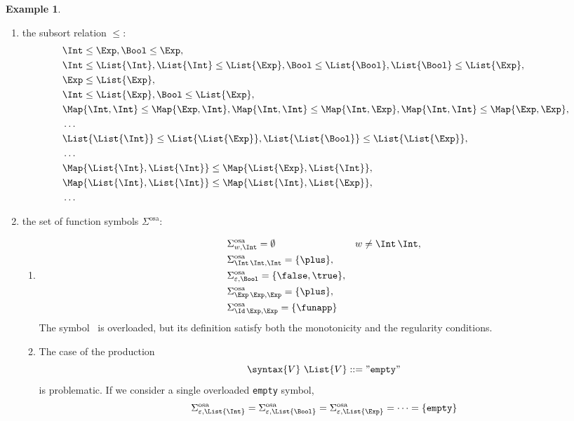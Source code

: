 \documentclass{article}
\theoremstyle{definition}
\newtheorem{example}{Example}[section]
\theoremstyle{definition}
\theoremstyle{definition}
\theoremstyle{definition}
\theoremstyle{theorem}
\theoremstyle{theorem}
\theoremstyle{theorem}
\theoremstyle{theorem}
\theoremstyle{theorem}
\begin{document}
{\begin{example}
\begin{enumerate}
\begin{align*}
&\Map{\List{\Int},\List{\Int}}, \Map{\List{\Int},\List{\Bool}}, \Map{\List{\Int},\List{\Exp}},\\
&\ldots\\
&\Map{\Map{\Int,\Int}, \Map{\Int,\Int}}, \Map{\Map{\Int,\Int},\Map{\Int,\Bool}},\\ 
&\ldots
\end{align*}
\item the subsort relation $\le$:
\begin{align*}
&\Int\le \Exp, \Bool\le \Exp,\\
&\Int\le \List{\Int}, \List{\Int}\le \List{\Exp}, \Bool\le\List{\Bool}, \List{\Bool}\le \List{\Exp},\\ &\Exp\le\List{\Exp},\\
&\Int\le \List{\Exp},  \Bool\le\List{\Exp},\\
&\Map{\Int,\Int}\le \Map{\Exp,\Int}, \Map{\Int,\Int}\le \Map{\Int,\Exp}, \Map{\Int,\Int}\le \Map{\Exp,\Exp},\\
&\ldots\\
&\List{\List{\Int}}\le\List{\List{\Exp}}, \List{\List{\Bool}}\le \List{\List{\Exp}},\\
&\ldots\\
&\Map{\List{\Int},\List{\Int}}\le \Map{\List{\Exp},\List{\Int}}, \\
&\Map{\List{\Int},\List{\Int}}\le \Map{\List{\Int},\List{\Exp}},\\
&\ldots
\end{align*}
\item the set of function symbols $\Sigma^\textrm{osa}$:
\begin{enumerate}
\item
\begin{align*}
&\Sigma^\textrm{osa}_{w,\Int}=\emptyset &&w\not=\Int\,\Int,\\
&\Sigma^\textrm{osa}_{\Int\,\Int,\Int}=\{\plus\},\\
&\Sigma^\textrm{osa}_{\varepsilon,\Bool}=\{\false,\true\},\\
&\Sigma^\textrm{osa}_{\Exp\,\Exp,\Exp} = \{\plus\},\\
&\Sigma^\textrm{osa}_{\Id\,\Exp,\Exp} = \{\funapp\}
\end{align*}
The symbol \plus\ is overloaded, but its definition satisfy both the monotonicity and the regularity conditions. 
\item
The case of the production
\[
\syntax\{V\}\ \List{V} ::= "\texttt{empty}"
\]
is problematic. If we consider a single overloaded \texttt{empty} symbol,
\[
\Sigma^\textrm{osa}_{\varepsilon,\List{\Int}}=\Sigma^\textrm{osa}_{\varepsilon,\List{\Bool}}=\Sigma^\textrm{osa}_{\varepsilon,\List{\Exp}}=\cdots=\{\texttt{empty}\}
\]
\end{enumerate}
\end{enumerate}
\end{example}}
\end{document}
